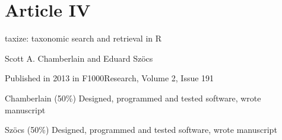 \begin{sloppypar}
\section*{Article IV}
\small
\begin{description}
    \setlength\itemsep{0.3em}
	\item[Title:] taxize: taxonomic search and retrieval in R
	\item[Authors:] Scott A. Chamberlain and Eduard Szöcs
	\item[Status:] Published in 2013 in F1000Research, Volume 2, Issue 191
	\item[Contributions:] Chamberlain (50\%) Designed, programmed and tested software, wrote manuscript

	Szöcs (50\%) Designed, programmed and tested software, wrote manuscript
\end{description}
\end{sloppypar}
